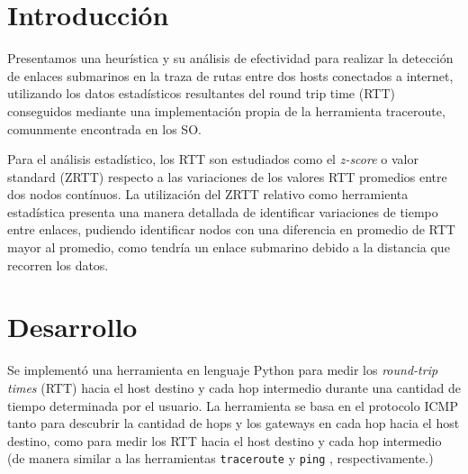 \documentclass[a4paper, 10pt, twoside]{article}
\begin{document}
\newpage




\tableofcontents

\newpage




\section{Introducción}

Presentamos una heurística y su análisis de efectividad para realizar la detección de enlaces submarinos en la traza de rutas entre dos hosts conectados a internet, utilizando los datos estadísticos resultantes del round trip time (RTT) conseguidos mediante una implementación propia de la herramienta traceroute, comunmente encontrada en los SO.

Para el análisis estadístico, los RTT son estudiados como el \textit{z-score} o valor standard (ZRTT) respecto a las variaciones de los valores RTT promedios entre dos nodos contínuos. La utilización del ZRTT relativo como herramienta estadística presenta una manera detallada de identificar variaciones de tiempo entre enlaces, pudiendo identificar nodos con una diferencia en promedio de RTT mayor al promedio, como tendría un enlace submarino debido a la distancia que recorren los datos.




\section{Desarrollo}

Se implementó una herramienta en lenguaje Python para medir los \emph{round-trip times} (RTT) hacia el host destino y cada hop intermedio durante una cantidad de tiempo determinada por el usuario. La herramienta se basa en el protocolo ICMP \cite{rfc-792} tanto para descubrir la cantidad de hops y los gateways en cada hop hacia el host destino, como para medir los RTT hacia el host destino y cada hop intermedio (de manera similar a las herramientas \texttt{traceroute} \cite{wiki-traceroute} y \texttt{ping} \cite{wiki-ping}, respectivamente.)
\end{document}
